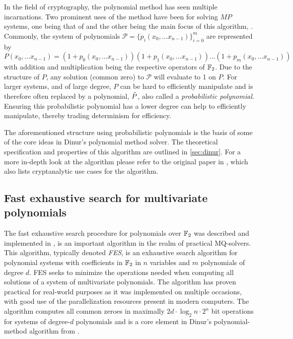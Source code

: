 In the field of cryptography, the polynomial method has seen multiple incarnations. Two prominent uses of the method have been for solving $MP$ systems, one being that of \cite{doi:10.1137/1.9781611974782.143} and the other being the main focus of this algorithm, \cite{eurocrypt-2021-30841}. Commonly, the system of polynomials $\mathcal{P} = \{p_i(x_0, \dots x_{n - 1})\}_{i = 0}^m$ are represented by 
$$
    P(x_0, \dots x_{n - 1}) = (1 + p_0(x_0, \dots x_{n - 1}))(1 + p_1(x_0, \dots x_{n - 1})) \dots (1 + p_m(x_0, \dots x_{n - 1}))
$$
with addition and multiplication being the respective operators of $\mathbb{F}_2$. Due to the structure of $P$, any solution (common zero) to $\mathcal{P}$ will evaluate to 1 on $P$. For larger systems, and of large degree, $P$ can be hard to efficiently manipulate and is therefore often replaced by a polynomial, $\Tilde{P}$, also called a \textit{probabilistic polynomial}. Ensuring this probabilistic polynomial has a lower degree can help to efficiently manipulate, thereby trading determinism for efficiency.

The aforementioned structure using probabilistic polynomials is the basis of some of the core ideas in Dinur's polynomial method solver. The theoretical specification and properties of this algorithm are outlined in \cref{sec:dinur}. For a more in-depth look at the algorithm please refer to the original paper in \cite{eurocrypt-2021-30841}, which also lists cryptanalytic use cases for the algorithm.

\subsection{Fast exhaustive search for multivariate polynomials} \label{sec:prereq:fes}
The fast exhaustive search procedure for polynomials over $\mathbb{F}_2$ was described and implemented in \cite{ches-2010-23990, cryptoeprint:2013/436, tungchoumasters},
is an important algorithm in the realm of practical MQ-solvers. This algorithm, typically denoted \textit{FES}, is an exhaustive search algorithm for polynomial systems with coefficients in $\mathbb{F}_2$ in $n$ variables and $m$ polynomials of degree $d$. FES seeks to minimize the operations needed when computing all solutions of a system of multivariate polynomials. The algorithm has proven practical for real-world purposes as it was implemented on multiple occasions, with good use of the parallelization resources present in modern computers. The algorithm computes all common zeroes in maximally $2d\cdot \log_2n \cdot 2^n$ bit operations
for systems of degree-$d$ polynomials and is a core element in Dinur's polynomial-method algorithm from \cite{eurocrypt-2021-30841}.

